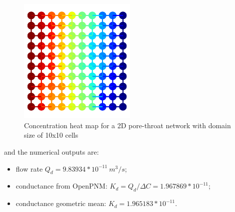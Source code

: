 \documentclass{article}
\begin{document}
\begin{figure}[htbp]
    \centering
    \includegraphics[width=0.5\textwidth]{images/fromOpenPNM/concentrationHeatMap10x10.png}
    \caption{Concentration heat map for a 2D pore-throat network with domain size of 10x10 cells}
    \label{fig:Concentration100x10}
\end{figure}
and the numerical outputs are:
\begin{itemize}
    \item flow rate $Q_d = 9.83934 * 10^{-11} \: m^3/s$;
    \item conductance from OpenPNM: $K_d = Q_d/\Delta C = 1.967869 * 10^{-11}$;
    \item conductance geometric mean: $K_d = 1.965183*10^{-11}$.
\end{itemize}

\FloatBarrier  %
\end{document}
